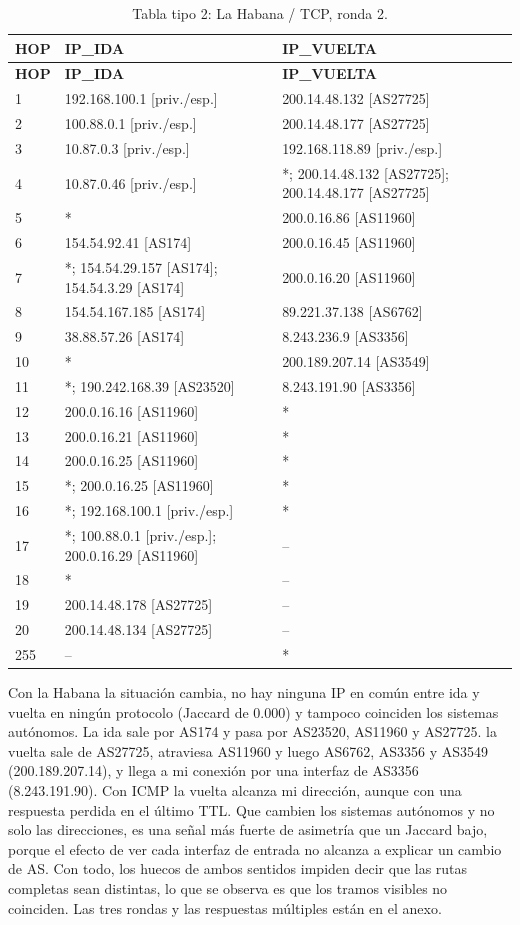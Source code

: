\begin{longtable}{p{0.95cm}p{7.075cm}p{7.075cm}}
\caption{Tabla tipo 2: La Habana / TCP, ronda 2.}\label{tabla2:200.14.48.134:TCP} \\
\toprule
\textbf{HOP} & \textbf{IP\_\allowbreak{}IDA} & \textbf{IP\_\allowbreak{}VUELTA} \\ \midrule
\endfirsthead
\toprule
\textbf{HOP} & \textbf{IP\_\allowbreak{}IDA} & \textbf{IP\_\allowbreak{}VUELTA} \\ \midrule
\endhead
1 & 192.168.100.1 [priv./esp.] & 200.14.48.132 [AS27725] \\
2 & 100.88.0.1 [priv./esp.] & 200.14.48.177 [AS27725] \\
3 & 10.87.0.3 [priv./esp.] & 192.168.118.89 [priv./esp.] \\
4 & 10.87.0.46 [priv./esp.] & *; 200.14.48.132 [AS27725]; 200.14.48.177 [AS27725] \\
5 & * & 200.0.16.86 [AS11960] \\
6 & 154.54.92.41 [AS174] & 200.0.16.45 [AS11960] \\
7 & *; 154.54.29.157 [AS174]; 154.54.3.29 [AS174] & 200.0.16.20 [AS11960] \\
8 & 154.54.167.185 [AS174] & 89.221.37.138 [AS6762] \\
9 & 38.88.57.26 [AS174] & 8.243.236.9 [AS3356] \\
10 & * & 200.189.207.14 [AS3549] \\
11 & *; 190.242.168.39 [AS23520] & 8.243.191.90 [AS3356] \\
12 & 200.0.16.16 [AS11960] & * \\
13 & 200.0.16.21 [AS11960] & * \\
14 & 200.0.16.25 [AS11960] & * \\
15 & *; 200.0.16.25 [AS11960] & * \\
16 & *; 192.168.100.1 [priv./esp.] & * \\
17 & *; 100.88.0.1 [priv./esp.]; 200.0.16.29 [AS11960] & -- \\
18 & * & -- \\
19 & 200.14.48.178 [AS27725] & -- \\
20 & 200.14.48.134 [AS27725] & -- \\
255 & -- & * \\
\bottomrule
\end{longtable}
\endgroup

Con la Habana la situación cambia, no hay ninguna IP en común entre ida y vuelta en ningún protocolo (Jaccard de 0.000) y tampoco coinciden los sistemas autónomos. La ida sale por AS174 y pasa por AS23520, AS11960 y AS27725. la vuelta sale de AS27725, atraviesa AS11960 y luego AS6762, AS3356 y AS3549 (200.189.207.14), y llega a mi conexión por una interfaz de AS3356 (8.243.191.90). Con ICMP la vuelta alcanza mi dirección, aunque con una respuesta perdida en el último TTL.
Que cambien los sistemas autónomos y no solo las direcciones, es una señal más fuerte de asimetría que un Jaccard bajo, porque el efecto de ver cada interfaz de entrada no alcanza a explicar un cambio de AS. Con todo, los huecos de ambos sentidos impiden decir que las rutas completas sean distintas, lo que se observa es que los tramos visibles no coinciden. Las tres rondas y las respuestas múltiples están en el anexo.


